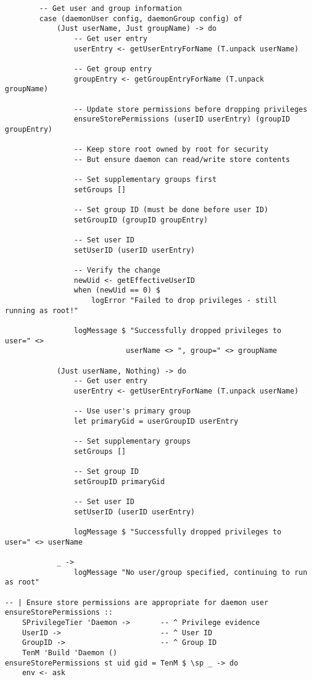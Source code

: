 \documentclass{article}
\begin{document}
\begin{tcolorbox}[title=Ten/Daemon/Core.hs Changes]
\begin{verbatim}
        -- Get user and group information
        case (daemonUser config, daemonGroup config) of
            (Just userName, Just groupName) -> do
                -- Get user entry
                userEntry <- getUserEntryForName (T.unpack userName)

                -- Get group entry
                groupEntry <- getGroupEntryForName (T.unpack groupName)

                -- Update store permissions before dropping privileges
                ensureStorePermissions (userID userEntry) (groupID groupEntry)

                -- Keep store root owned by root for security
                -- But ensure daemon can read/write store contents

                -- Set supplementary groups first
                setGroups []

                -- Set group ID (must be done before user ID)
                setGroupID (groupID groupEntry)

                -- Set user ID
                setUserID (userID userEntry)

                -- Verify the change
                newUid <- getEffectiveUserID
                when (newUid == 0) $
                    logError "Failed to drop privileges - still running as root!"

                logMessage $ "Successfully dropped privileges to user=" <>
                            userName <> ", group=" <> groupName

            (Just userName, Nothing) -> do
                -- Get user entry
                userEntry <- getUserEntryForName (T.unpack userName)

                -- Use user's primary group
                let primaryGid = userGroupID userEntry

                -- Set supplementary groups
                setGroups []

                -- Set group ID
                setGroupID primaryGid

                -- Set user ID
                setUserID (userID userEntry)

                logMessage $ "Successfully dropped privileges to user=" <> userName

            _ ->
                logMessage "No user/group specified, continuing to run as root"

-- | Ensure store permissions are appropriate for daemon user
ensureStorePermissions ::
    SPrivilegeTier 'Daemon ->       -- ^ Privilege evidence
    UserID ->                       -- ^ User ID
    GroupID ->                      -- ^ Group ID
    TenM 'Build 'Daemon ()
ensureStorePermissions st uid gid = TenM $ \sp _ -> do
    env <- ask


\end{verbatim}
\end{tcolorbox}
\end{document}
